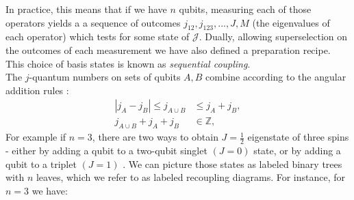 \documentclass{article}
\begin{document}
In practice, this means that if we have $n$ qubits, measuring each of those operators yields a a sequence of outcomes $j_{12}, j_{123}, ... , J, M$ (the eigenvalues of each operator) which tests for some state of $\mathcal{J}$. Dually, allowing superselection on the outcomes of each measurement we have also defined a preparation recipe. This choice of basis states is known as \textit{sequential coupling}.\\
The $j$-quantum numbers on sets of qubits $A,B$ combine according to the angular addition rules \cite{Woit17}: 
\begin{align*}
|j_A - j_B| \leq j_{A \cup B} &\leq j_A + j_B, \\
j_{A \cup B} + j_A + j_B & \in \mathbb{Z},
\end{align*}
For example if $n=3$, there are two ways to obtain $J=\frac{1}{2}$ eigenstate of three spins - either by adding a qubit to a two-qubit singlet $(J=0)$ state, or by adding a qubit to a triplet $(J=1)$ \cite{Pauncz67}.
We can picture those states as labeled binary trees with $n$ leaves, which we refer to as labeled recoupling diagrams. For instance, for $n=3$ we have:
\end{document}
